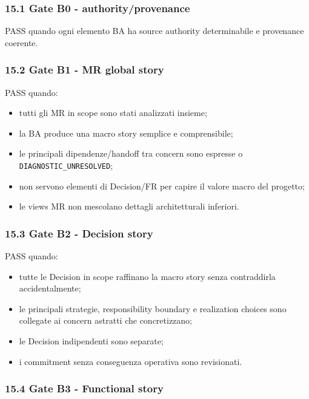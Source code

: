 \documentclass[
  9pt,
  a4paper,
]{article}
\providecommand{\tightlist}{%
  \setlength{\itemsep}{0pt}\setlength{\parskip}{0pt}}
\begin{document}
\subsubsection{15.1 Gate B0 -
authority/provenance}\label{gate-b0---authorityprovenance}

PASS quando ogni elemento BA ha source authority determinabile e
provenance coerente.

\subsubsection{15.2 Gate B1 - MR global
story}\label{gate-b1---mr-global-story}

PASS quando:

\begin{itemize}
\tightlist
\item
  tutti gli MR in scope sono stati analizzati insieme;
\item
  la BA produce una macro story semplice e comprensibile;
\item
  le principali dipendenze/handoff tra concern sono espresse o
  \texttt{DIAGNOSTIC\_UNRESOLVED};
\item
  non servono elementi di Decision/FR per capire il valore macro del
  progetto;
\item
  le views MR non mescolano dettagli architetturali inferiori.
\end{itemize}

\subsubsection{15.3 Gate B2 - Decision
story}\label{gate-b2---decision-story}

PASS quando:

\begin{itemize}
\tightlist
\item
  tutte le Decision in scope raffinano la macro story senza contraddirla
  accidentalmente;
\item
  le principali strategie, responsibility boundary e realization choices
  sono collegate ai concern astratti che concretizzano;
\item
  le Decision indipendenti sono separate;
\item
  i commitment senza conseguenza operativa sono revisionati.
\end{itemize}

\subsubsection{15.4 Gate B3 - Functional
story}\label{gate-b3---functional-story}
\end{document}
